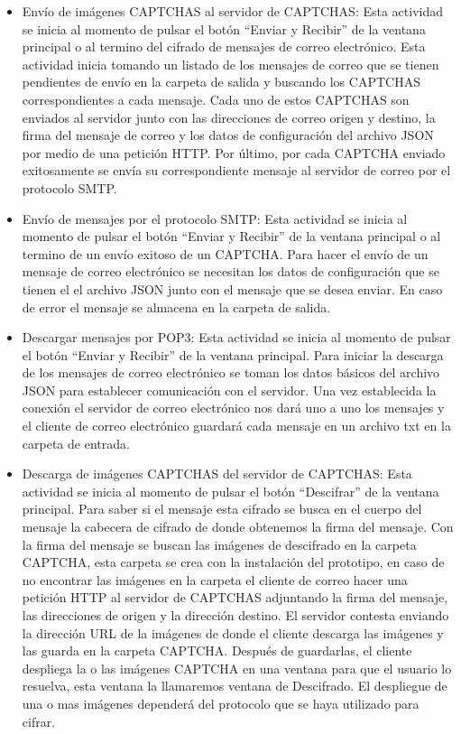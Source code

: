 \begin{itemize}
 \item Envío de imágenes CAPTCHAS al servidor de CAPTCHAS: Esta actividad se inicia al momento de pulsar el botón “Enviar y Recibir” de la ventana principal o al termino del cifrado de mensajes de correo electrónico.
Esta actividad inicia tomando un listado de los mensajes de correo que se tienen pendientes de envío en la carpeta de salida y buscando los CAPTCHAS correspondientes a cada mensaje. Cada uno de estos CAPTCHAS son enviados al servidor junto con las direcciones de correo origen y destino, la firma del mensaje de correo y los datos de configuración del archivo JSON por medio de una petición HTTP. Por último, por cada CAPTCHA enviado exitosamente se envía su correspondiente mensaje al servidor de correo por el protocolo SMTP.
 \item Envío de mensajes por el protocolo SMTP: Esta actividad se inicia al momento de pulsar el botón “Enviar y Recibir” de la ventana principal o al termino de un envío exitoso de un CAPTCHA.
Para hacer el envío de un mensaje de correo electrónico se necesitan los datos de configuración que se tienen el el archivo JSON junto con el mensaje que se desea enviar. En caso de error el mensaje se almacena en la carpeta de salida.
 \item Descargar mensajes por POP3: Esta actividad se inicia al momento de pulsar el botón “Enviar y Recibir” de la ventana principal.
Para iniciar la descarga de los mensajes de correo electrónico se toman los datos básicos del archivo JSON para establecer comunicación con el servidor. Una vez establecida la conexión el servidor de correo electrónico nos dará uno a uno los mensajes y el cliente de correo electrónico guardará cada mensaje en un archivo txt en la carpeta de entrada.
 \item Descarga de imágenes CAPTCHAS del servidor de CAPTCHAS: Esta actividad se inicia al momento de pulsar el botón “Descifrar” de la ventana principal.
Para saber si el mensaje esta cifrado se busca en el cuerpo del mensaje la cabecera de cifrado de donde obtenemos la firma del mensaje. Con la firma del mensaje se buscan las imágenes de descifrado en la carpeta CAPTCHA, esta carpeta se crea con la instalación del prototipo, en caso de no encontrar las imágenes en la carpeta el cliente de correo hacer una petición HTTP al servidor de CAPTCHAS adjuntando la firma del mensaje, las direcciones de origen y la dirección destino.
El servidor contesta enviando la dirección URL de la imágenes de  donde  el cliente descarga las imágenes y las guarda en la carpeta CAPTCHA. Después de guardarlas, el cliente despliega la o las imágenes CAPTCHA en una ventana para que el usuario lo resuelva, esta ventana la llamaremos ventana de Descifrado. El despliegue de una o mas imágenes dependerá del protocolo que se haya utilizado para cifrar.

\end{itemize}
